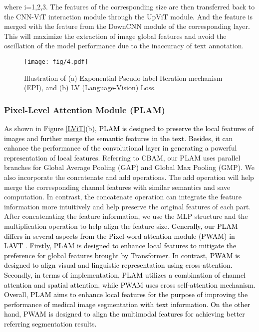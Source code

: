 \documentclass[lettersize,journal]{IEEEtran}
\begin{document}
where i=1,2,3. The features of the corresponding size are then transferred back to the CNN-ViT interaction module through the UpViT module. And the feature is merged with the feature from the DownCNN module of the corresponding layer. This will maximize the extraction of image global features and avoid the oscillation of the model performance due to the inaccuracy of text annotation.
\begin{figure}[ht]\centering
  \texttt{[image: fig/4.pdf]}
  \caption{Illustration of (a) Exponential Pseudo-label Iteration mechanism (EPI), and (b) LV (Language-Vision) Loss.}
  \label{EPI&LV}
  \vspace{-3mm}
\end{figure}
\subsubsection{\textbf{P}ixel-\textbf{L}evel \textbf{A}ttention \textbf{M}odule (PLAM)}

As shown in Figure \ref{LViT}(b), \textcolor{black}{PLAM is designed to preserve the local features of images and further merge the semantic features in the text. Besides, it can enhance the performance of the convolutional layer in generating a powerful representation of local features.} Referring to CBAM\cite{36woo2018cbam}, our PLAM uses parallel branches for Global Average Pooling (GAP) and Global Max Pooling (GMP). We also incorporate the concatenate and add operations. The add operation will help merge the corresponding channel features with similar semantics and save computation. In contrast, the concatenate operation can integrate the feature information more intuitively and help preserve the original features of each part. After concatenating the feature information, we use the MLP structure and the multiplication operation to help align the feature size.
\textcolor{black}{
Generally, our PLAM differs in several aspects from the Pixel-word attention module (PWAM) in LAVT \cite{Yang22CVPR}. Firstly, PLAM is designed to enhance local features to mitigate the preference for global features brought by Transformer. In contrast, PWAM is designed to align visual and linguistic representation using cross-attention. Secondly, in terms of implementation,  PLAM utilizes a combination of channel attention and spatial attention, while PWAM uses cross self-attention mechanism. Overall, PLAM aims to enhance local features for the purpose of improving the performance of medical image segmentation with text information. On the other hand, PWAM is designed to align the multimodal features for achieving better referring segmentation results. 
}
\end{document}
